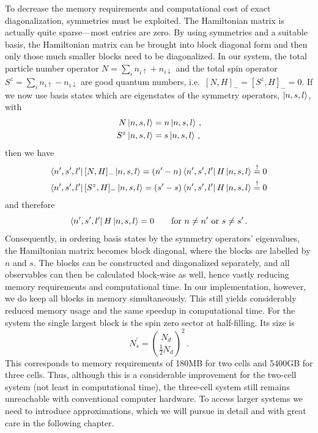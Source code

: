 %
To decrease the memory requirements and computational cost of exact
diagonalization, symmetries must be exploited. The Hamiltonian matrix is
actually quite sparse---most entries are zero. By using symmetries and a
suitable basis, the Hamiltonian matrix can be brought into block diagonal form
and then only those much smaller blocks need to be diagonalized. In our
 system, the total particle number operator $N = \sum_i n_{i\uparrow}
+ n_{i\downarrow}$ and the total spin operator $S^z = \sum_i n_{i\uparrow} -
n_{i\downarrow}$ are good quantum numbers, i.e.\ $[N,H]_- = [S^z,H]_- = 0$. If
we now use basis states which are eigenstates of the symmetry operators,
$\left|n,s,l\right>$, with
%
\begin{equation}
\begin{split}
  N \left|n,s,l\right> &= n \left|n,s,l\right> \, , \\
  S^z \left|n,s,l\right> &= s \left|n,s,l\right> \, ,
\end{split}
\end{equation}
%
then we have
%
\begin{equation}
\begin{split}
  \left<n^{\prime},s^{\prime},l^{\prime}\right| [N,H]_- \left|n,s,l\right> = 
  (n^{\prime} - n) \left<n^{\prime},s^{\prime},l^{\prime}\right| H \left|n,s,l\right>
  \stackrel{!}{=} 0 \\
  \left<n^{\prime},s^{\prime},l^{\prime}\right| [S^z,H]_- \left|n,s,l\right> = 
  (s^{\prime} - s) \left<n^{\prime},s^{\prime},l^{\prime}\right| H \left|n,s,l\right>
  \stackrel{!}{=} 0
\end{split}
\end{equation}
%
and therefore
%
\begin{equation}
  \left<n^{\prime},s^{\prime},l^{\prime}\right| H \left|n,s,l\right> = 0 \qquad
  \textrm{for } n \ne n^{\prime} \textrm{ or } s \ne s^{\prime} \, .
\end{equation}
%
Consequently, in ordering basis states by the symmetry operators' eigenvalues,
the Hamiltonian matrix becomes block diagonal, where the blocks are labelled by
$n$ and $s$. The blocks can be constructed and diagonalized separately, and all
observables can then be calculated block-wise as well, hence vastly reducing
memory requirements and computational time. In our implementation, however, we
do keep all blocks in memory simultaneously. This still yields considerably
reduced memory usage and the same speedup in computational time. For the
 system the single largest block is the spin zero sector at
half-filling. Its size is
%
\begin{equation}
  N_s^{\prime} = \binom{N_d}{\frac{1}{2} N_d}^2 \, .
\end{equation}
%
This corresponds to memory requirements of 180MB for two cells and 5400GB for
three cells. Thus, although this is a considerable improvement for the two-cell
system (not least in computational time), the three-cell system still remains
unreachable with conventional computer hardware. To access larger systems we
need to introduce approximations, which we will pursue in detail and with great
care in the following chapter.

